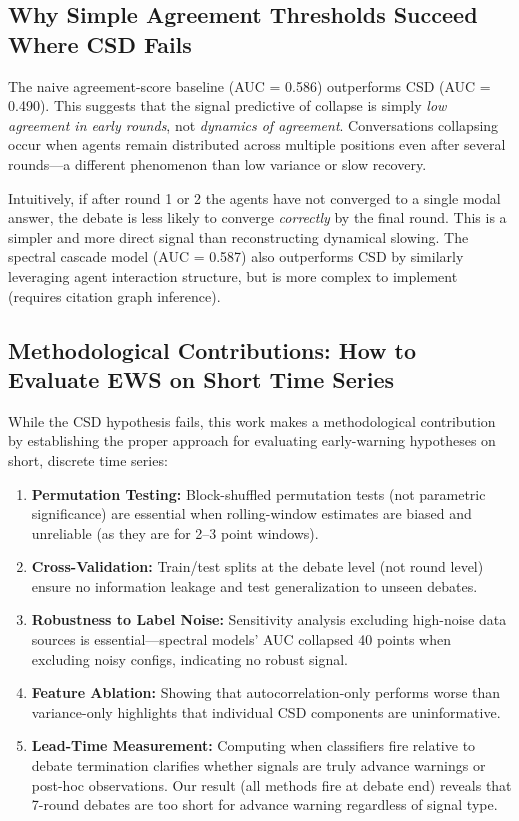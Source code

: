 \documentclass[11pt,letterpaper]{article}
\begin{document}
\subsection{Why Simple Agreement Thresholds Succeed Where CSD Fails}

The naive agreement-score baseline (AUC = 0.586) outperforms CSD (AUC = 0.490). This suggests that the signal predictive of collapse is simply \emph{low agreement in early rounds}, not \emph{dynamics of agreement}. Conversations collapsing occur when agents remain distributed across multiple positions even after several rounds---a different phenomenon than low variance or slow recovery.

Intuitively, if after round 1 or 2 the agents have not converged to a single modal answer, the debate is less likely to converge \emph{correctly} by the final round. This is a simpler and more direct signal than reconstructing dynamical slowing. The spectral cascade model (AUC = 0.587) also outperforms CSD by similarly leveraging agent interaction structure, but is more complex to implement (requires citation graph inference).

\subsection{Methodological Contributions: How to Evaluate EWS on Short Time Series}

While the CSD hypothesis fails, this work makes a methodological contribution by establishing the proper approach for evaluating early-warning hypotheses on short, discrete time series:

\begin{enumerate}
\item \textbf{Permutation Testing:} Block-shuffled permutation tests (not parametric significance) are essential when rolling-window estimates are biased and unreliable (as they are for 2--3 point windows).

\item \textbf{Cross-Validation:} Train/test splits at the debate level (not round level) ensure no information leakage and test generalization to unseen debates.

\item \textbf{Robustness to Label Noise:} Sensitivity analysis excluding high-noise data sources is essential---spectral models' AUC collapsed 40 points when excluding noisy configs, indicating no robust signal.

\item \textbf{Feature Ablation:} Showing that autocorrelation-only performs worse than variance-only highlights that individual CSD components are uninformative.

\item \textbf{Lead-Time Measurement:} Computing when classifiers fire relative to debate termination clarifies whether signals are truly advance warnings or post-hoc observations. Our result (all methods fire at debate end) reveals that 7-round debates are too short for advance warning regardless of signal type.
\end{enumerate}
\end{document}
